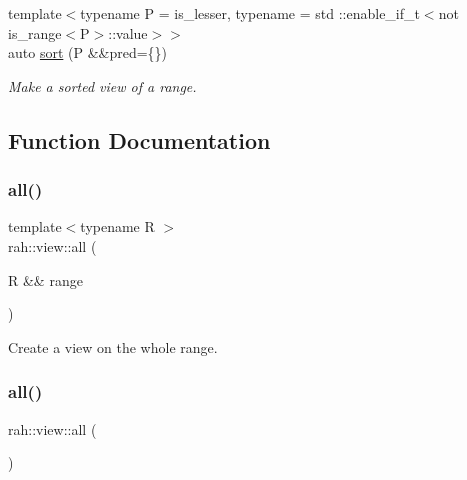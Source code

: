 \begin{DoxyCompactItemize}
{\footnotesize template$<$typename P  = is\+\_\+lesser, typename  = std \+::enable\+\_\+if\+\_\+t$<$not is\+\_\+range$<$\+P$>$\+::value$>$$>$ }\\auto \mbox{\hyperlink{namespacerah_1_1view_aee3389bbe781c123aceb0d017a470e11}{sort}} (P \&\&pred=\{\})
\begin{DoxyCompactList}\small\item\em Make a sorted view of a range. \end{DoxyCompactList}\end{DoxyCompactItemize}


\subsection{Function Documentation}
\mbox{\label{namespacerah_1_1view_a08f246d1e3e728738c48741274f5e9d7}} 
\subsubsection{\texorpdfstring{all()}{all()}\hspace{0.1cm}{\footnotesize\ttfamily [1/2]}}
{\footnotesize\ttfamily template$<$typename R $>$ \\
rah\+::view\+::all (\begin{DoxyParamCaption}\item[{R \&\&}]{range }\end{DoxyParamCaption})}



Create a view on the whole range. 

\mbox{\label{namespacerah_1_1view_addec9cf697ca9378bb7b68ad732d9a0d}} 
\subsubsection{\texorpdfstring{all()}{all()}\hspace{0.1cm}{\footnotesize\ttfamily [2/2]}}
{\footnotesize\ttfamily rah\+::view\+::all (\begin{DoxyParamCaption}{ }\end{DoxyParamCaption})\hspace{0.3cm}{\ttfamily [inline]}}



